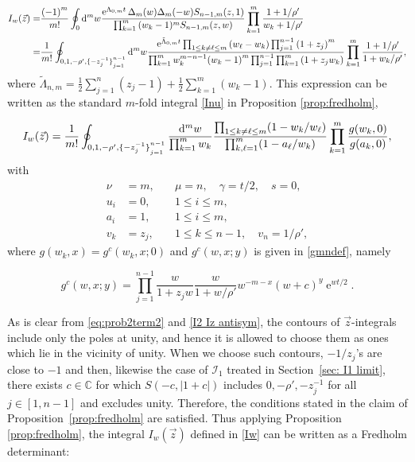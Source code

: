 \documentclass[cmp]{svjour}
\numberwithin{theorem}{section}
\numberwithin{equation}{section}
\DeclareMathOperator{\e}{e}
\def\dd{{\rm d}}
\begin{document}
\begin{align}
I_w (\vec{z}) = & \frac{{(-1)}^m}{m!}
		\oint_{0}
		\dd^m w
		\frac{\e^{\Lambda_{0,m}t} \Delta_{m}(w) \Delta_m(-w) S_{n-1,m}(z,1) }{\prod_{k=1}^{m}{ (w_k-1)^m} S_{n-1,m}(z,w) }
		\prod_{k=1}^{m}\frac{1+1/\rho'}{w_k+1/\rho'} 
		\nonumber \\ %
		= & \frac{1}{m!}\oint_{0,1,-\rho', {\{ -z_j^{-1} \}}_{j=1}^{n-1}} \dd^m w
		\frac{\e^{\tilde{\Lambda}_{0,m}t } \prod_{1 \leq k \neq \ell \leq m}{(w_\ell - w_k)} \prod_{j=1}^{n-1}{ {(1 + z_j)}^m } }{ \prod_{ k=1 }^{m}{ w_k^{m-n-1} {(w_k - 1)}^m \prod_{j=1}^{n-1}{ \prod_{k=1}^{m}{ (1 + z_j w_k) } } }  } \prod_{k=1}^{m}{ \frac{1+1/\rho'}{1+w_k /\rho'} }, \nonumber
\end{align}
where $\tilde{\Lambda}_{n,m}=\frac12\sum_{j=1}^n(z_j-1)+\frac12\sum_{k=1}^m(w_k-1)$.
This expression can be written as the standard $m$-fold integral \eqref{Inu} in Proposition \ref{prop:fredholm},

\begin{equation*}
I_w(\vec{z}) = \frac{1}{m!}\oint_{0,1,-\rho', {\{ -z_j^{-1} \}}_{j=1}^{n-1}} \frac{\dd^m w}{ \prod_{k=1}^m w_k} \frac{\prod_{1\leq k\neq \ell\leq m}(1-w_k/w_\ell)}{\prod_{k,\ell=1}^m (1-a_\ell/w_k)} \prod_{k=1}^m \frac{g(w_k,0 )}{g(a_k,0)},
\end{equation*}
with
\[
\begin{array}{rll}
\nu &=m, \quad &\mu=n, \quad \gamma = t/2,\quad s=0, \\
u_i &=0, & 1\le i \le m, \\
a_i &=1, \quad & 1\leq i\leq m, \\
v_k &=z_j, & 1\le k\le n-1,\quad v_n =1/\rho',
\end{array}
\]
where $g(w_k,x) = g^c(w_k,x;0)$ and $g^c(w,x;y)$ is given in \eqref{gmndef}, namely

\begin{equation*}
g^c(w, x; y)
= \prod_{j=1}^{n-1}\frac{w}{1+z_jw} \frac{w}{1 + w/ \rho'} w^{-m-x} {(w + c)}^y \e^{wt/2}.
\end{equation*}

\noindent As is clear from \eqref{eq:prob2term2} and \eqref{I2 Iz antisym}, the contours of $\vec{z}$-integrals include only the poles at unity, and hence it is allowed to choose them as ones which lie in the vicinity of unity. 
When we choose such contours, $-1/z_j$'s are close to $-1$ and then, likewise the case of $\mathcal{I}_1$ treated in Section~\ref{sec: I1 limit}, there exists $c \in \mathbb{C}$ for which $S(-c,|1+c|)$ includes $0,-\rho',-z_j^{-1}$ for all $j \in [1,n-1]$ and excludes unity.
Therefore, the conditions stated in the claim of Proposition~\ref{prop:fredholm} are satisfied.
Thus applying Proposition \ref{prop:fredholm}, the integral $I_w(\vec{z})$ defined in \eqref{Iw} can be written as a Fredholm determinant:
\end{document}
